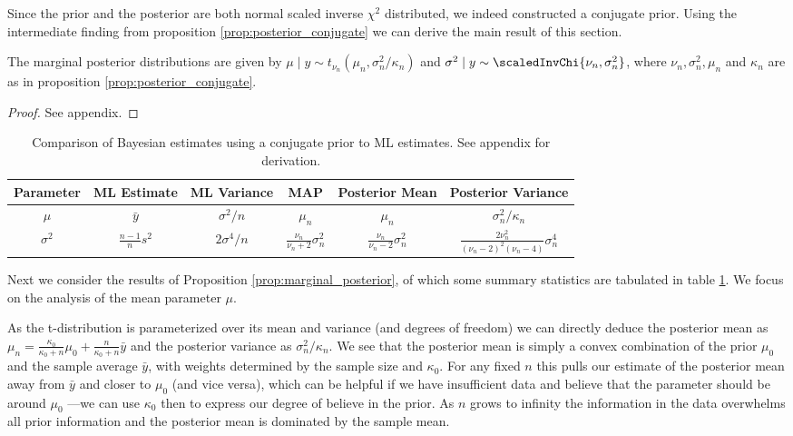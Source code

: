 Since the prior and the posterior are both normal scaled inverse $\chi^2$ distributed, we indeed constructed a conjugate prior.
Using the intermediate finding from proposition \ref{prop:posterior_conjugate} we can derive the main result of this section.

\begin{proposition}\label{prop:marginal_posterior}
  The marginal posterior distributions are given by $\mu \mid y \sim t_{\nu_n}(\mu_n, \sigma_n^2 / \kappa_n)$ and $\sigma^2 \mid y \sim \scaledInvChi{\nu_n, \sigma_n^2}$, where $\nu_n, \sigma_n^2, \mu_n$ and $\kappa_n$ are as in proposition \ref{prop:posterior_conjugate}.
\end{proposition}
\begin{proof}
  See appendix.
\end{proof}

\begin{table}[ht]
\centering
\def\arraystretch{1.3}
{\small
 \begin{tabular}{c | c c c c c}
 Parameter & ML Estimate & ML Variance & MAP & Posterior Mean & Posterior Variance\\
 \hline
 $\mu$ & $\bar{y}$ & $\sigma^2 / n$ & $\mu_n$ & $\mu_n$ & $\sigma_n^2 / \kappa_n$\\
 $\sigma^2$ & $\frac{n-1}{n}s^2$ & $2 \sigma^4 / n$ & $\frac{\nu_n}{\nu_n + 2} \sigma_n^2$ & $\frac{\nu_n}{\nu_n - 2} \sigma_n^2$ & $\frac{2 \nu_n^2}{(\nu_n - 2)^2(\nu_n - 4)} \sigma_n^4$
 \end{tabular}
 }
\caption{{\small Comparison of Bayesian estimates using a conjugate prior to ML estimates. See appendix for derivation.}}
\label{tab:comp_conjugate_bay_ml}
\end{table}

Next we consider the results of Proposition \ref{prop:marginal_posterior}, of which some summary statistics are tabulated in table \ref{tab:comp_conjugate_bay_ml}.
We focus on the analysis of the mean parameter $\mu$.

As the t-distribution is parameterized over its mean and variance (and degrees of freedom) we can directly deduce the posterior mean as $\mu_n =\frac{\kappa_0}{\kappa_0 + n}\mu_0 + \frac{n}{\kappa_0 + n}\bar{y}$ and the posterior variance as $\sigma_n^2 / \kappa_n$.
We see that the posterior mean is simply a convex combination of the prior $\mu_0$ and the sample average $\bar{y}$, with weights determined by the sample size and $\kappa_0$.
For any fixed $n$ this pulls our estimate of the posterior mean away from $\bar{y}$ and closer to $\mu_0$ (and vice versa), which can be helpful if we have insufficient data and believe that the parameter should be around $\mu_0$ ---we can use $\kappa_0$ then to express our degree of believe in the prior.
As $n$ grows to infinity the information in the data overwhelms all prior information and the posterior mean is dominated by the sample mean.

